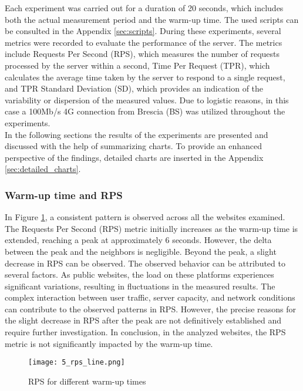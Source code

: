 Each experiment was carried out for a duration of 20 seconds, which includes both the actual measurement period and the warm-up time. The used scripts can be consulted 
in the Appendix \ref{sec:scripts}. During 
these experiments, several metrics were recorded to evaluate the performance of the server. The metrics include Requests Per Second (RPS), which measures 
the number of requests processed by the server within a second, Time Per Request (TPR), which calculates the average time taken by the server 
to respond to a single request, and TPR Standard Deviation (SD), which provides an indication of the variability or dispersion of the measured values.
Due to logistic reasons, in this case a 100Mb/s 4G connection from Brescia (BS) was utilized throughout the experiments.\\
In the following sections the results of the experiments are presented and discussed with the help of summarizing charts. To provide an
enhanced perspective of the findings, detailed charts are inserted in the Appendix \ref{sec:detailed_charts}.


\subsubsection{Warm-up time and RPS}
In Figure \ref{fig:5_rps_line}, a consistent pattern is observed across all the websites examined. The Requests Per Second (RPS) metric 
initially increases as the warm-up time is extended, reaching a peak at approximately 6 seconds. However, the delta between the peak and
the neighbors is negligible. Beyond the peak, a slight decrease in RPS can be observed.
The observed behavior can be attributed to several factors. As public websites, the load on these platforms experiences 
significant variations, resulting in fluctuations in the measured results. The complex interaction between user traffic, server capacity,
and network conditions can contribute to the observed patterns in RPS. However, the precise reasons for the slight decrease 
in RPS after the peak are not definitively established and require further investigation.
In conclusion, in the analyzed websites, the RPS metric is not significantly impacted by the warm-up time.\\

    \begin{figure}[H]
        \centering
        \texttt{[image: 5\_rps\_line.png]}
        \caption{\small RPS for different warm-up times}
        \label{fig:5_rps_line}
    \end{figure}


